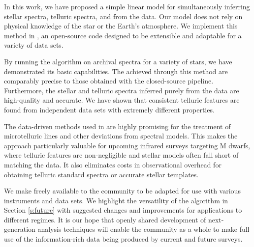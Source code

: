 \documentclass[modern]{aastex62}
\begin{document}
In this work, we have proposed a simple linear model for simultaneously inferring stellar spectra, telluric spectra, and \RVs from the data. 
Our model does not rely on physical knowledge of the star or the Earth's atmosphere. 
We implement this method in \wobble, an open-source code designed to be extensible and adaptable for a variety of data sets. 

By running the \wobble algorithm on archival \HARPS spectra for a variety of stars, we have demonstrated its basic capabilities. 
The \RVs achieved through this method are comparably precise to those obtained with the closed-source \HARPS pipeline. 
Furthermore, the stellar and telluric spectra inferred purely from the data are high-quality and accurate. 
We have shown that consistent telluric features are found from independent data sets with extremely different properties. 

The data-driven methods used in \wobble are highly promising for the treatment of microtelluric lines and other deviations from spectral models. 
This makes the approach particularly valuable for upcoming infrared surveys targeting M dwarfs, where telluric features are non-negligible and stellar models often fall short of matching the data. 
It also eliminates costs in observational overhead for obtaining telluric standard spectra or accurate stellar templates.

We make \wobble freely available to the \RV community to be adapted for use with various instruments and data sets. 
We highlight the versatility of the algorithm in Section \ref{s:future} with suggested changes and improvements for applications to different regimes. 
It is our hope that openly shared development of next-generation \RV analysis techniques will enable the community as a whole to make full use of the information-rich data being produced by current and future \EPRV surveys.




\end{document}
